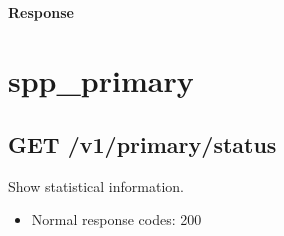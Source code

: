\documentclass[a4paper,11pt,openany,oneside,english]{sphinxmanual}
\begin{document}
\paragraph{Response}
\label{\detokenize{api_ref/proc_independ:id9}}
\begin{sphinxVerbatim}[commandchars=\\\{\},formatcom=\footnotesize]
\PYG{p}{[}
     
     
     \PYG{p}{[}
    \PYG{p}{]}
     
     
     
     \PYG{p}{[} \PYG{p}{]}
     
     
     
     \PYG{p}{[}   \PYG{p}{]}
\PYG{p}{]}
\end{sphinxVerbatim}


\section{spp\_primary}
\label{\detokenize{api_ref/spp_primary:spp-primary}}\label{\detokenize{api_ref/spp_primary:spp-ctl-rest-api-spp-primary}}\label{\detokenize{api_ref/spp_primary::doc}}

\subsection{GET /v1/primary/status}
\label{\detokenize{api_ref/spp_primary:get-v1-primary-status}}
Show statistical information.
\begin{itemize}
\item {} 
Normal response codes: 200

\end{itemize}
\end{document}
